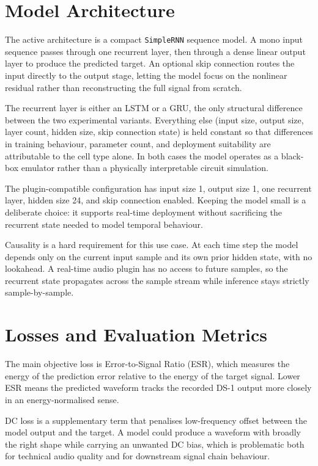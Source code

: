 \section{Model Architecture}
\label{sec:model-architecture}

The active architecture is a compact \texttt{SimpleRNN} sequence model. A mono input sequence passes through one recurrent layer, then through a dense linear output layer to produce the predicted target. An optional skip connection routes the input directly to the output stage, letting the model focus on the nonlinear residual rather than reconstructing the full signal from scratch.

The recurrent layer is either an LSTM or a GRU, the only structural difference between the two experimental variants. Everything else (input size, output size, layer count, hidden size, skip connection state) is held constant so that differences in training behaviour, parameter count, and deployment suitability are attributable to the cell type alone. In both cases the model operates as a black-box emulator rather than a physically interpretable circuit simulation.

The plugin-compatible configuration has input size 1, output size 1, one recurrent layer, hidden size 24, and skip connection enabled. Keeping the model small is a deliberate choice: it supports real-time deployment without sacrificing the recurrent state needed to model temporal behaviour.

Causality is a hard requirement for this use case. At each time step the model depends only on the current input sample and its own prior hidden state, with no lookahead. A real-time audio plugin has no access to future samples, so the recurrent state propagates across the sample stream while inference stays strictly sample-by-sample.

\section{Losses and Evaluation Metrics}
\label{sec:losses-evaluation-metrics}

The main objective loss is Error-to-Signal Ratio (ESR), which measures the energy of the prediction error relative to the energy of the target signal. Lower ESR means the predicted waveform tracks the recorded DS-1 output more closely in an energy-normalised sense.

DC loss is a supplementary term that penalises low-frequency offset between the model output and the target. A model could produce a waveform with broadly the right shape while carrying an unwanted DC bias, which is problematic both for technical audio quality and for downstream signal chain behaviour.

